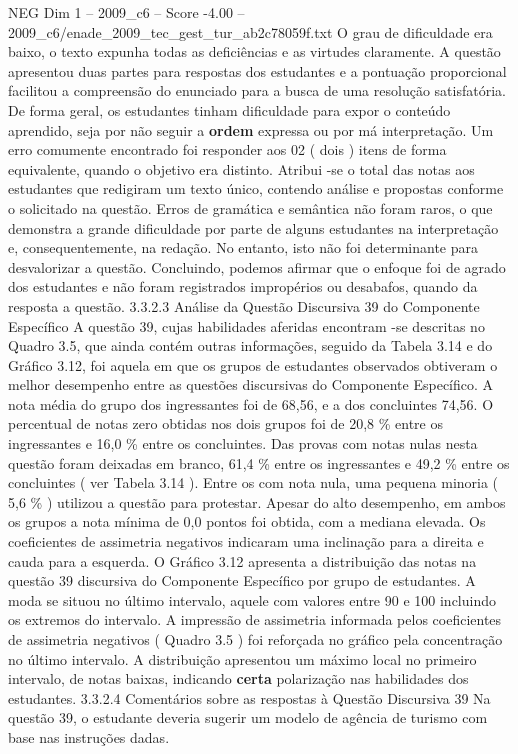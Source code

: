 \begin{textsample}{NEG Dim 1 – 2009\_c6 – Score -4.00 – 2009\_c6/enade\_2009\_tec\_gest\_tur\_ab2c78059f.txt}
O grau de dificuldade era baixo, o texto expunha todas as deficiências e as virtudes claramente.
A questão apresentou duas partes para respostas dos estudantes e a pontuação proporcional facilitou a compreensão do enunciado para a busca de uma resolução satisfatória.
De forma geral, os estudantes tinham dificuldade para expor o conteúdo aprendido, seja por não seguir a \textbf{ordem} expressa ou por má interpretação.
Um erro comumente encontrado foi responder aos 02 ( dois ) itens de forma equivalente, quando o objetivo era distinto.
Atribui -se o total das notas aos estudantes que redigiram um texto único, contendo análise e propostas conforme o solicitado na questão.
Erros de gramática e semântica não foram raros, o que demonstra a grande dificuldade por parte de alguns estudantes na interpretação e, consequentemente, na redação.
No entanto, isto não foi determinante para desvalorizar a questão.
Concluindo, podemos afirmar que o enfoque foi de agrado dos estudantes e não foram registrados impropérios ou desabafos, quando da resposta a questão. 3.3.2.3 Análise da Questão Discursiva 39 do Componente Específico A questão 39, cujas habilidades aferidas encontram -se descritas no Quadro 3.5, que ainda contém outras informações, seguido da Tabela 3.14 e do Gráfico 3.12, foi aquela em que os grupos de estudantes observados obtiveram o melhor desempenho entre as questões discursivas do Componente Específico.
A nota média do grupo dos ingressantes foi de 68,56, e a dos concluintes 74,56.
O percentual de notas zero obtidas nos dois grupos foi de 20,8 \% entre os ingressantes e 16,0 \% entre os concluintes.
Das provas com notas nulas nesta questão foram deixadas em branco, 61,4 \% entre os ingressantes e 49,2 \% entre os concluintes ( ver Tabela 3.14 ).
Entre os com nota nula, uma pequena minoria ( 5,6 \% ) utilizou a questão para protestar.
Apesar do alto desempenho, em ambos os grupos a nota mínima de 0,0 pontos foi obtida, com a mediana elevada.
Os coeficientes de assimetria negativos indicaram uma inclinação para a direita e cauda para a esquerda.
O Gráfico 3.12 apresenta a distribuição das notas na questão 39 discursiva do Componente Específico por grupo de estudantes.
A moda se situou no último intervalo, aquele com valores entre 90 e 100 incluindo os extremos do intervalo.
A impressão de assimetria informada pelos coeficientes de assimetria negativos ( Quadro 3.5 ) foi reforçada no gráfico pela concentração no último intervalo.
A distribuição apresentou um máximo local no primeiro intervalo, de notas baixas, indicando \textbf{certa} polarização nas habilidades dos estudantes. 3.3.2.4 Comentários sobre as respostas à Questão Discursiva 39 Na questão 39, o estudante deveria sugerir um modelo de agência de turismo com base nas instruções dadas.

\end{textsample}
